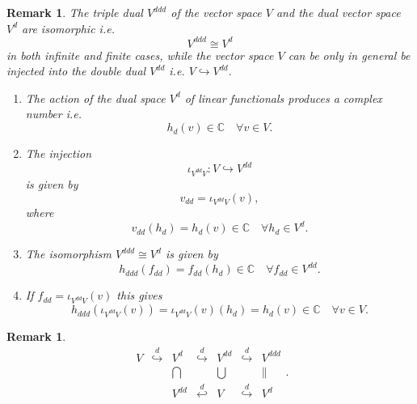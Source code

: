 \documentclass[aps,preprint]{revtex4}
\newtheorem{remark}[theorem]{Remark}
\begin{document}
\begin{remark}
The \emph{triple dual} $V^{ddd}$ of the vector space $V$ and the \emph{dual
vector} space $V^{d}$ are isomorphic i.e. 
\begin{equation}
V^{ddd}\cong V^{d}
\end{equation}%
in \emph{both} infinite and finite cases, while the vector space $V$ can be
only in general be injected into the double dual $V^{dd}$ i.e. $%
V\hookrightarrow V^{dd}.$

\begin{enumerate}
\item The action of the dual space $V^{d}$ of linear functionals produces a
complex number i.e. 
\begin{equation}
h_{d}\left( v\right) \in \mathbb{C\quad }\forall v\in V.
\end{equation}

\item The injection%
\begin{equation}
\iota _{V^{dd}V}:V\hookrightarrow V^{dd}
\end{equation}%
is given by 
\begin{equation}
v_{dd}=\iota _{V^{dd}V}\left( v\right) ,
\end{equation}%
where 
\begin{equation}
v_{dd}\left( h_{d}\right) =h_{d}\left( v\right) \in \mathbb{C\quad }\forall
h_{d}\in V^{d}.
\end{equation}

\item The isomorphism $V^{ddd}\cong V^{d}$ is given by 
\begin{equation}
h_{ddd}\left( f_{dd}\right) =f_{dd}\left( h_{d}\right) \in \mathbb{C\quad }%
\forall f_{dd}\in V^{dd}.
\end{equation}

\item If $f_{dd}=\iota _{V^{dd}V}\left( v\right) $ this gives 
\begin{equation}
h_{ddd}\left( \iota _{V^{dd}V}\left( v\right) \right) =\iota
_{V^{dd}V}\left( v\right) \left( h_{d}\right) =h_{d}\left( v\right) \in 
\mathbb{C\quad }\forall v\in V.
\end{equation}
\end{enumerate}
\end{remark}

\begin{remark}
\begin{equation}
\begin{array}{ccccccc}
V & \overset{d}{\hookrightarrow } & V^{d} & \overset{d}{\hookrightarrow } & 
V^{dd} & \overset{d}{\hookrightarrow } & V^{ddd} \\ 
&  & \bigcap &  & \bigcup &  & \parallel \\ 
&  & V^{dd} & \overset{d}{\hookleftarrow } & V & \overset{d}{\hookrightarrow 
} & V^{d}%
\end{array}%
.
\end{equation}
\end{remark}
\end{document}
